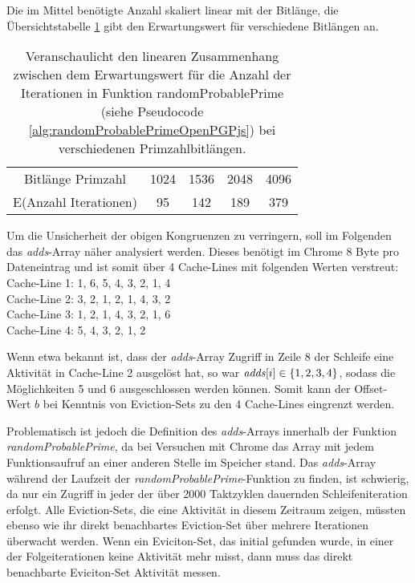 Die im Mittel benötigte Anzahl skaliert linear mit der Bitlänge, die Übersichtstabelle \ref{tbl:bitLengthNumberOfIterations} gibt den Erwartungswert für verschiedene Bitlängen an.

\begin{table}[h]
\caption{Veranschaulicht den linearen Zusammenhang zwischen dem Erwartungswert für die Anzahl der Iterationen in Funktion randomProbablePrime (siehe Pseudocode \ref{alg:randomProbablePrimeOpenPGPjs}) bei verschiedenen Primzahlbitlängen.}
\label{tbl:bitLengthNumberOfIterations}
\begin{tabular}{c|cccc}
Bitlänge Primzahl     & 1024 & 1536 & 2048 & 4096 \\
E(Anzahl Iterationen) & 95   & 142  & 189  & 379 
\end{tabular}
\end{table}

Um die Unsicherheit der obigen Kongruenzen zu verringern, soll im Folgenden das \textit{adds}-Array näher analysiert werden.
Dieses benötigt im Chrome 8 Byte pro Dateneintrag und ist somit über 4 Cache-Lines mit folgenden Werten verstreut:\\
Cache-Line 1: 1, 6, 5, 4, 3, 2, 1, 4\\
Cache-Line 2: 3, 2, 1, 2, 1, 4, 3, 2\\
Cache-Line 3: 1, 2, 1, 4, 3, 2, 1, 6\\
Cache-Line 4: 5, 4, 3, 2, 1, 2

Wenn etwa bekannt ist, dass der \textit{adds}-Array Zugriff in Zeile 8 der Schleife eine Aktivität in Cache-Line 2 ausgelöst hat, so war $\text{\textit{adds}}[i] \in \{1,2,3,4\}$, sodass die Möglichkeiten 5 und 6 ausgeschlossen werden können.
Somit kann der Offset-Wert $b$ bei Kenntnis von Eviction-Sets zu den 4 Cache-Lines eingrenzt werden.

Problematisch ist jedoch die Definition des \textit{adds}-Arrays innerhalb der Funktion \textit{randomProbablePrime}, da bei Versuchen mit Chrome das Array mit jedem Funktionsaufruf an einer anderen Stelle im Speicher stand.
Das \textit{adds}-Array während der Laufzeit der \textit{randomProbablePrime}-Funktion zu finden, ist schwierig, da nur ein Zugriff in jeder der über 2000 Taktzyklen dauernden Schleifeniteration erfolgt.
Alle Eviction-Sets, die eine Aktivität in diesem Zeitraum zeigen, müssten ebenso wie ihr direkt benachbartes Eviction-Set über mehrere Iterationen überwacht werden.
Wenn ein Eviciton-Set, das initial gefunden wurde, in einer der Folgeiterationen keine Aktivität mehr misst, dann muss das direkt benachbarte Eviciton-Set Aktivität messen.

